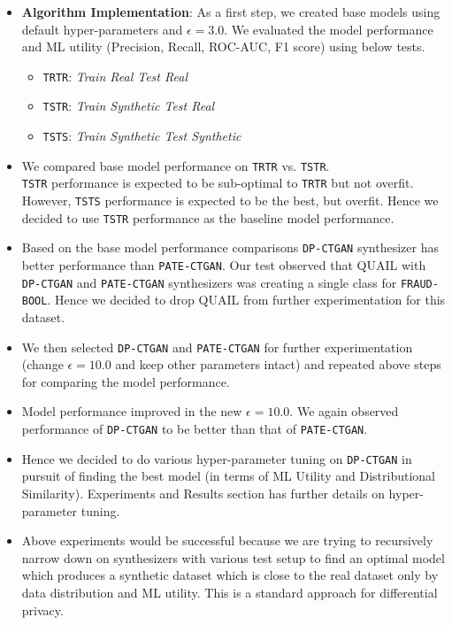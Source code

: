 \documentclass[10pt,twocolumn,letterpaper]{article}
\begin{document}
\begin{itemize}
    \item \textbf{Algorithm Implementation}: As a first step, we created base models using default hyper-parameters and $\epsilon=3.0$. We evaluated the model performance and ML utility (Precision, Recall, ROC-AUC, F1 score) using below tests. %
    \begin{itemize}
        \item \verb'TRTR': \textit{Train Real Test Real}
        \item \verb'TSTR': \textit{Train Synthetic Test Real}
        \item \verb'TSTS': \textit{Train Synthetic Test Synthetic}
    \end{itemize}

    \item We compared base model performance on \verb'TRTR' vs. \verb'TSTR'. \\
    \verb'TSTR' performance is expected to be sub-optimal to \verb'TRTR' but not overfit. However, \verb'TSTS' performance is expected to be the best, but overfit. Hence we decided to use \verb'TSTR' performance as the baseline model performance. \\

    \item Based on the base model performance comparisons \verb'DP-CTGAN' synthesizer has better performance than \verb'PATE-CTGAN'. Our test observed that QUAIL with \verb'DP-CTGAN' and \verb'PATE-CTGAN' synthesizers was creating a single class for \verb'FRAUD-BOOL'. Hence we decided to drop QUAIL from further experimentation for this dataset.

    \item We then selected \verb'DP-CTGAN' and \verb'PATE-CTGAN' for further experimentation (change $\epsilon=10.0$ and keep other parameters intact) and repeated above steps for comparing the model performance.

    \item Model performance improved in the new $\epsilon=10.0$. We again observed performance of \verb'DP-CTGAN' to be better than that of \verb'PATE-CTGAN'.

    \item Hence we decided to do various hyper-parameter tuning on \verb'DP-CTGAN' in pursuit of finding the best model (in terms of ML Utility and Distributional Similarity). Experiments and Results section has further details on hyper-parameter tuning.

    \item Above experiments would be successful because we are trying to recursively narrow down on synthesizers with various test setup to find an optimal model which produces a synthetic dataset which is close to the real dataset only by data distribution and ML utility. This is a standard approach for differential privacy.



\end{itemize}
\end{document}
